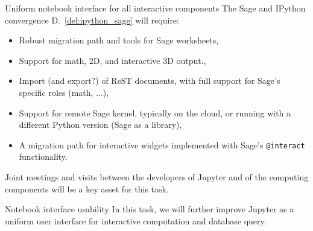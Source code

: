 \begin{Workpackage}{\thewpno}
\begin{task}{Uniform notebook interface for all interactive components}
  The Sage and IPython convergence D.~\ref{del:ipython_sage} will
  require:
  \begin{itemize}
  \item Robust migration path and tools for Sage worksheets,
  \item Support for math, 2D, and interactive 3D output.,
  \item Import (and export?) of ReST documents, with full support for
    Sage's specific roles (math, ...),
  \item Support for remote Sage kernel, typically on the cloud, or
    running with a different Python version (Sage as a library),
  \item A migration path for interactive widgets implemented with
    Sage's \texttt{@interact} functionality.
  \end{itemize}

  Joint meetings and visits between the developers of Jupyter and of
  the computing components will be a key asset for this task.

\end{task}

\begin{task}{Notebook interface usability}
  In this task, we will further improve Jupyter as a uniform user
  interface for interactive computation and database query.



\end{task}
\end{Workpackage}
